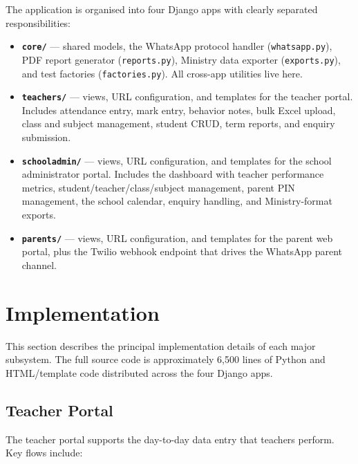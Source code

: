 \documentclass[11pt,a4paper]{article}
\begin{document}
The application is organised into four Django apps with clearly separated
responsibilities:

\begin{itemize}[leftmargin=*]
    \item \textbf{\texttt{core/}} --- shared models, the WhatsApp protocol
    handler (\texttt{whatsapp.py}), PDF report generator
    (\texttt{reports.py}), Ministry data exporter (\texttt{exports.py}),
    and test factories (\texttt{factories.py}). All cross-app utilities
    live here.

    \item \textbf{\texttt{teachers/}} --- views, URL configuration, and
    templates for the teacher portal. Includes attendance entry, mark
    entry, behavior notes, bulk Excel upload, class and subject
    management, student CRUD, term reports, and enquiry submission.

    \item \textbf{\texttt{schooladmin/}} --- views, URL configuration, and
    templates for the school administrator portal. Includes the dashboard
    with teacher performance metrics, student/teacher/class/subject
    management, parent PIN management, the school calendar, enquiry
    handling, and Ministry-format exports.

    \item \textbf{\texttt{parents/}} --- views, URL configuration, and
    templates for the parent web portal, plus the Twilio webhook endpoint
    that drives the WhatsApp parent channel.
\end{itemize}

\section{Implementation}

This section describes the principal implementation details of each major
subsystem. The full source code is approximately 6{,}500 lines of Python and
HTML/template code distributed across the four Django apps.

\subsection{Teacher Portal}

The teacher portal supports the day-to-day data entry that teachers perform.
Key flows include:
\end{document}
